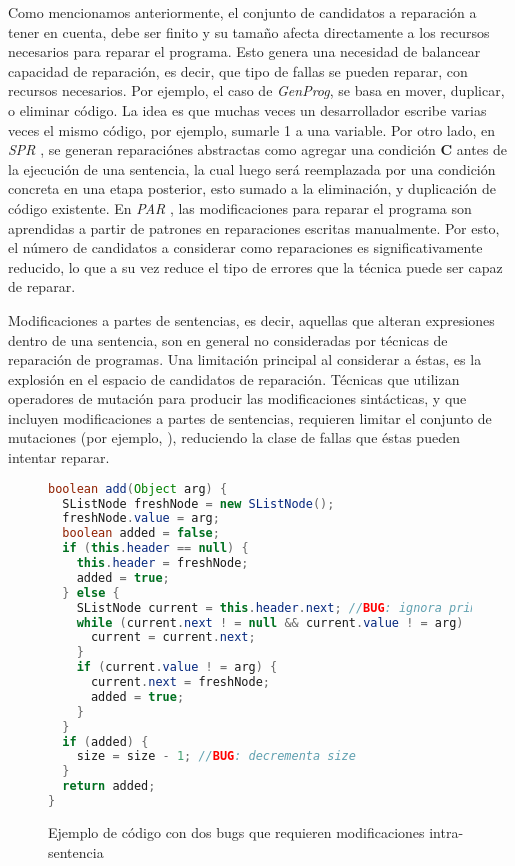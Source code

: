 Como mencionamos anteriormente, el conjunto de candidatos a reparaci\'on a tener en cuenta, debe ser finito y su tama\~no afecta directamente a los recursos necesarios para reparar el programa. Esto genera una necesidad de balancear capacidad de reparaci\'on, es decir, que tipo de fallas se pueden reparar, con recursos necesarios. Por ejemplo, el caso de \emph{GenProg}, se basa en mover, duplicar, o eliminar c\'odigo. La idea es que muchas veces un desarrollador escribe varias veces el mismo c\'odigo, por ejemplo, sumarle 1 a una variable. Por otro lado, en \emph{SPR} \cite{bibliography.repair.LongR15}, se generan reparaci\'ones abstractas como agregar una condici\'on \textbf{C} antes de la ejecuci\'on de una sentencia, la cual luego ser\'a reemplazada por una condici\'on concreta en una etapa posterior, esto sumado a la eliminaci\'on, y duplicaci\'on de c\'odigo existente. En \emph{PAR} \cite{bibliography.repair.KimNSK13}, las modificaciones para reparar el programa son aprendidas a partir de patrones en reparaciones escritas manualmente. Por esto, el n\'umero de candidatos a considerar como reparaciones es significativamente reducido, lo que a su vez reduce el tipo de errores que la t\'ecnica puede ser capaz de reparar.

Modificaciones a partes de sentencias, es decir, aquellas que alteran expresiones dentro de una sentencia, son en general no consideradas por t\'ecnicas de reparaci\'on de programas. Una limitaci\'on principal al considerar a \'estas, es la explosi\'on en el espacio de candidatos de reparaci\'on. T\'ecnicas que utilizan operadores de mutaci\'on para producir las modificaciones sint\'acticas, y que incluyen modificaciones a partes de sentencias, requieren limitar el conjunto de mutaciones (por ejemplo, \cite{bibliography.repair.GopinathMK11}), reduciendo la clase de fallas que \'estas pueden intentar reparar.

\begin{figure}
\footnotesize
\begin{lstlisting}[frame=single, mathescape=true,language=Java,basicstyle={},xleftmargin=.010\textwidth,xrightmargin=.007\textwidth]
boolean add(Object arg) {
  SListNode freshNode = new SListNode();
  freshNode.value = arg;
  boolean added = false;
  if (this.header == null) {
    this.header = freshNode;
    added = true;
  } else {
    SListNode current = this.header.next; //BUG: ignora primer nodo
    while (current.next ! = null && current.value ! = arg) {
      current = current.next;
    }
    if (current.value ! = arg) {
      current.next = freshNode;
      added = true;
    }
  }
  if (added) {
    size = size - 1; //BUG: decrementa size
  }
  return added;
}
\end{lstlisting}
\caption{Ejemplo de c\'odigo con dos bugs que requieren modificaciones intra-sentencia}
\label{figures.examples.repair.exampleCode}
\end{figure}

